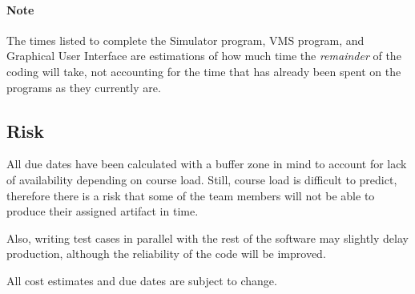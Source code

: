 \documentclass{article}
\begin{document}
\paragraph{Note}
The times listed to complete the Simulator program, VMS program, and Graphical User Interface are estimations of how much time the \emph{remainder} of the coding will take, not accounting for the time that has already been spent on the programs as they currently are.

\subsection{Risk}

	All due dates have been calculated with a buffer zone in mind to account for lack of availability depending on course load. Still, course load is difficult to predict, therefore there is a risk that some of the team members will not be able to produce their assigned artifact in time.

Also, writing test cases in parallel with the rest of the software may slightly delay production, although the reliability of the code will be improved.

All cost estimates and due dates are subject to change.

\listoffigures
\end{document}
